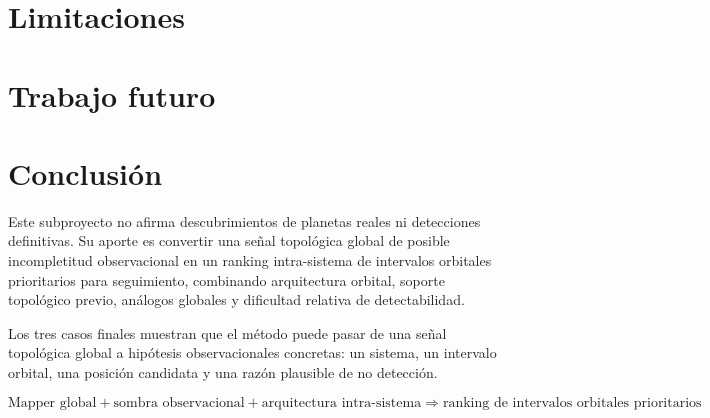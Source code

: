 \documentclass[11pt]{article}
\begin{document}
\section{Limitaciones}


\section{Trabajo futuro}


\section*{Conclusi\'on}
Este subproyecto no afirma descubrimientos de planetas reales ni detecciones definitivas. Su aporte es convertir una se\~nal topol\'ogica global de posible incompletitud observacional en un ranking intra-sistema de intervalos orbitales prioritarios para seguimiento, combinando arquitectura orbital, soporte topol\'ogico previo, an\'alogos globales y dificultad relativa de detectabilidad.

Los tres casos finales muestran que el m\'etodo puede pasar de una se\~nal topol\'ogica global a hip\'otesis observacionales concretas: un sistema, un intervalo orbital, una posici\'on candidata y una raz\'on plausible de no detecci\'on.

\[
\boxed{
\text{Mapper global}
+
\text{sombra observacional}
+
\text{arquitectura intra-sistema}
\Rightarrow
\text{ranking de intervalos orbitales prioritarios}
}
\]

\nocite{singh2007topological,carlsson2009topology,nasaexoplanetarchive,borucki2010kepler,ricker2015tess,winn2010transits,lovis2011radialvelocity,gaudi2012microlensing,bowler2016imaging}
\printbibliography[title={Referencias m\'inimas de contexto}]
\end{document}
